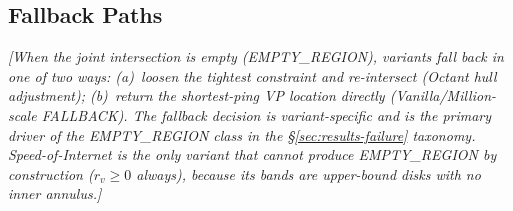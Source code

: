 \subsection{Fallback Paths}
\label{sec:framework-fallback}
\textit{[When the joint intersection is empty (EMPTY\_REGION), variants fall back in one of two ways:
(a)~loosen the tightest constraint and re-intersect (Octant hull adjustment);
(b)~return the shortest-ping VP location directly (Vanilla/Million-scale FALLBACK).
The fallback decision is variant-specific and is the primary driver of the EMPTY\_REGION
class in the §\ref{sec:results-failure} taxonomy.
Speed-of-Internet is the only variant that cannot produce EMPTY\_REGION by construction
($r_v \geq 0$ always), because its bands are upper-bound disks with no inner annulus.]}
